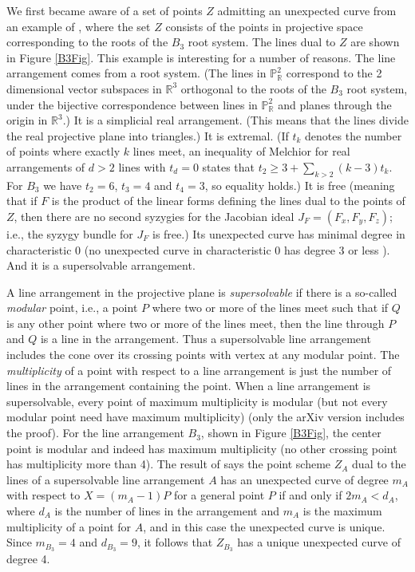 \documentclass[12pt]{amsart}
\numberwithin{equation}{section}
\theoremstyle{definition}
\newcommand{\RR}{ \ensuremath{\mathbb{R}}}
\newcommand{\PP}{ \ensuremath{\mathbb{P}}}
\begin{document}
We first became aware of a set of points $Z$ admitting an unexpected curve from an example of \cite{DIV}, where
the set $Z$ consists of the points in projective space corresponding to the roots of the $B_3$ root system. 
The lines dual to $Z$ are shown in Figure \ref{B3Fig}.
This example is interesting for a number of reasons.
The line arrangement comes from a root system. (The 
lines in $\PP^2_\RR$ correspond to the 2 dimensional vector subspaces in $\RR^3$ orthogonal to the roots of the $B_3$ root system,
under the bijective correspondence
between lines in $\PP^2_\RR$ and planes through the origin in $\RR^3$.) 
It is a simplicial real arrangement. (This means that the lines divide the real projective plane into triangles.)
It is extremal. (If $t_k$
denotes the number of points where exactly $k$ lines meet, an inequality of Melchior \cite{Me}
for real arrangements of $d>2$ lines with $t_d=0$ states that $t_2\geq 3+\sum_{k>2}(k-3)t_k$.
For $B_3$ we have $t_2=6$, $t_3=4$ and $t_4=3$, so equality holds.)
It is free (meaning that if $F$ is the product of the linear forms defining the lines dual to the points of $Z$,
then there are no second syzygies for the Jacobian ideal $J_F=(F_x,F_y,F_z)$; i.e.,
the syzygy bundle for $J_F$ is free.)
Its unexpected curve has minimal degree in characteristic 0 (no unexpected curve 
in characteristic 0 has degree 3 or less \cite{A, FGST}).
And it is a supersolvable arrangement. 

A line arrangement in the projective plane is {\em supersolvable} if there is a so-called 
{\em modular} point, i.e., a point $P$ where two or more of the lines meet
such that if $Q$ is any other point where two or more of the lines meet, then the line through
$P$ and $Q$ is a line in the arrangement. 
Thus a supersolvable line arrangement includes the cone over its
crossing points with vertex at any modular point.
The {\em multiplicity} of a point with respect to a line arrangement
is just the number of lines in the arrangement containing the point. When a line arrangement is supersolvable,
every point of maximum multiplicity is modular (but not every modular point 
need have maximum multiplicity)  \cite{AT} (only the arXiv version includes the proof). For the line arrangement $B_3$, shown in Figure \ref{B3Fig}, the center point 
is modular and indeed has maximum multiplicity (no other crossing point has multiplicity more than 4).
The result of \cite{DMO} says the point scheme $Z_A$ dual to the lines of a supersolvable line arrangement $A$ 
has an unexpected curve of degree $m_A$ with respect to $X=(m_A-1)P$ for a general point $P$ 
if and only if $2m_A<d_A$, where $d_A$ is the number 
of lines in the arrangement and $m_A$ is the maximum multiplicity of a point for $A$, 
and in this case the unexpected curve is unique. 
Since $m_{B_3}=4$ and $d_{B_3}=9$, it follows that $Z_{B_3}$
has a unique unexpected curve of degree 4.
\end{document}
